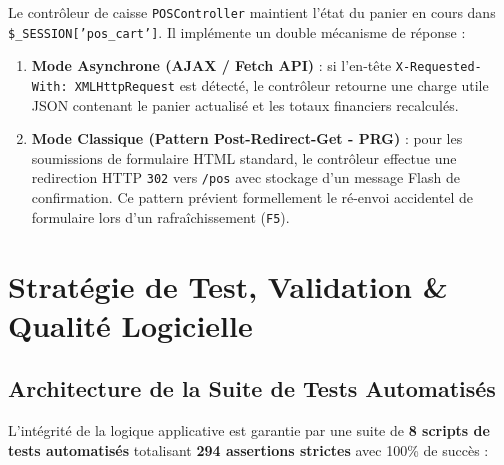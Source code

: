 \documentclass[11pt,a4paper,titlepage,twoside,openright]{report}
\begin{document}
Le contrôleur de caisse \texttt{POSController} maintient l'état du panier en cours dans \texttt{\$\_SESSION['pos\_cart']}. Il implémente un double mécanisme de réponse :
\begin{enumerate}
    \item \textbf{Mode Asynchrone (AJAX / Fetch API)} : si l'en-tête \texttt{X-Requested-With: XMLHttpRequest} est détecté, le contrôleur retourne une charge utile JSON contenant le panier actualisé et les totaux financiers recalculés.
    \item \textbf{Mode Classique (Pattern Post-Redirect-Get - PRG)} : pour les soumissions de formulaire HTML standard, le contrôleur effectue une redirection HTTP \texttt{302} vers \texttt{/pos} avec stockage d'un message Flash de confirmation. Ce pattern prévient formellement le ré-envoi accidentel de formulaire lors d'un rafraîchissement (\texttt{F5}).
\end{enumerate}

\chapter{Stratégie de Test, Validation \& Qualité Logicielle}

\section{Architecture de la Suite de Tests Automatisés}

L'intégrité de la logique applicative est garantie par une suite de \textbf{8 scripts de tests automatisés} totalisant \textbf{294 assertions strictes} avec 100\% de succès :
\end{document}
